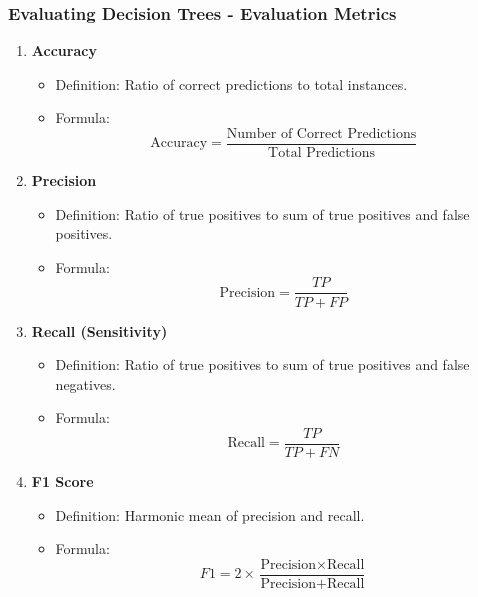 \documentclass[aspectratio=169]{beamer}
\begin{document}
\begin{frame}[fragile]
    \frametitle{Evaluating Decision Trees - Evaluation Metrics}
    \begin{enumerate}
        \item \textbf{Accuracy}  
        \begin{itemize}
            \item Definition: Ratio of correct predictions to total instances.
            \item Formula:  
                \[
                \text{Accuracy} = \frac{\text{Number of Correct Predictions}}{\text{Total Predictions}}
                \]
        \end{itemize}

        \item \textbf{Precision}  
        \begin{itemize}
            \item Definition: Ratio of true positives to sum of true positives and false positives.
            \item Formula:  
                \[
                \text{Precision} = \frac{TP}{TP + FP}
                \]
        \end{itemize}

        \item \textbf{Recall (Sensitivity)}  
        \begin{itemize}
            \item Definition: Ratio of true positives to sum of true positives and false negatives.
            \item Formula:  
                \[
                \text{Recall} = \frac{TP}{TP + FN}
                \]
        \end{itemize}

        \item \textbf{F1 Score}  
        \begin{itemize}
            \item Definition: Harmonic mean of precision and recall.
            \item Formula:  
                \[
                F1 = 2 \times \frac{\text{Precision} \times \text{Recall}}{\text{Precision} + \text{Recall}}
                \]
        \end{itemize}


\end{enumerate}
\end{frame}
\end{document}

